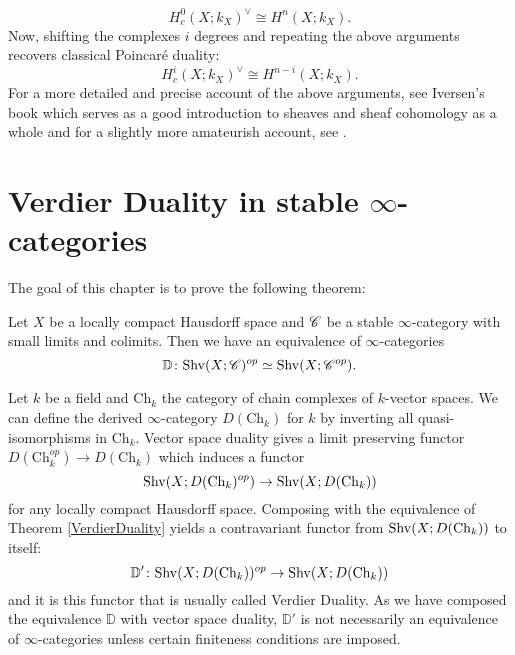 \documentclass[../../thesis.tex]{subfiles}
\begin{document}
\[
    H^0_c(X; k_X)^{\vee} \cong H^n(X;k_X).
\]
Now, shifting the complexes $i$ degrees and repeating the above arguments recovers classical Poincaré duality:
\[
    H^i_c(X; k_X)^{\vee} \cong H^{n-i}(X;k_X).
\]
For a more detailed and precise account of the above arguments, see Iversen's book \cite{Iversen} which serves as a good introduction to sheaves and sheaf cohomology as a whole and for a slightly more amateurish account, see \cite{BACH}.

\section{Verdier Duality in stable $\infty$-categories}
The goal of this chapter is to prove the following theorem:
\begin{theorem}\label{VerdierDuality}
    Let $X$ be a locally compact Hausdorff space and $\mathscr{C}$ be a stable $\infty$-category with small limits and colimits.
    Then we have an equivalence of $\infty$-categories
    \[
        \mathbb{D} \colon \mathrm{Shv}(X;\mathscr{C})^{op} \simeq \mathrm{Shv}(X;\mathscr{C}^{op}).
    \]
\end{theorem}
Let $k$ be a field and $\mathrm{Ch}_k$ the category of chain complexes of $k$-vector spaces.
We can define the derived $\infty$-category $D(\mathrm{Ch}_k)$ for $k$ by inverting all quasi-isomorphisms in $\mathrm{Ch}_k$.
Vector space duality gives a limit preserving functor $D(\mathrm{Ch}_k^{op}) \to D(\mathrm{Ch}_k)$ which induces a functor
\[
    \mathrm{Shv}(X;D(\mathrm{Ch}_k)^{op}) \to \mathrm{Shv}(X;D(\mathrm{Ch}_k))
\]
for any locally compact Hausdorff space.
Composing with the equivalence of Theorem \ref{VerdierDuality} yields a contravariant functor from $\mathrm{Shv}(X;D(\mathrm{Ch}_k))$ to itself:
\[
    \mathbb{D}'\colon \mathrm{Shv}(X;D(\mathrm{Ch}_k))^{op} \to \mathrm{Shv}(X;D(\mathrm{Ch}_k))
\]
and it is this functor that is usually called Verdier Duality. As we have composed the equivalence $\mathbb{D}$ with vector space duality, $\mathbb{D}'$ is not necessarily an equivalence of $\infty$-categories unless certain finiteness conditions are imposed.
\end{document}
